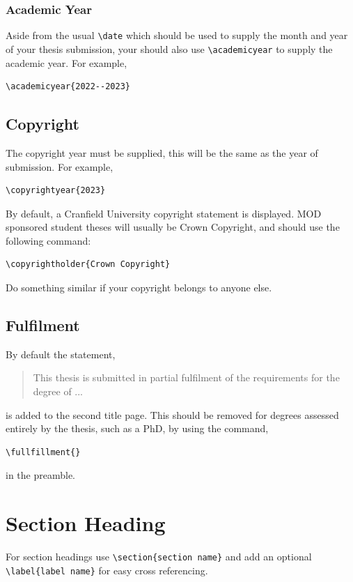 \documentclass[12pt,oneside]{book} %
\begin{document}
\subsubsection{Academic Year}
\label{sec:AcademicYear}
Aside from the usual \verb#\date# which should be used to supply the month and year of your thesis submission, your should also use \verb#\academicyear# to supply the academic year. For example,
\begin{verbatim} 
\academicyear{2022--2023}
\end{verbatim}

\subsection{Copyright}
\label{sec:copyright}
The copyright year must be supplied, this will be the same as the year of submission. For example,
\begin{verbatim} 
\copyrightyear{2023}
\end{verbatim}
By default, a Cranfield University copyright statement is displayed. MOD sponsored student theses will usually be Crown Copyright, and should use the following command:
\begin{verbatim}
\copyrightholder{Crown Copyright}
\end{verbatim}
Do something similar if your copyright belongs to anyone else.

\subsection{Fulfilment}
\label{sec:Fulfilment}
By default the statement,
\begin{quote} 
This thesis is submitted in partial fulfilment of the requirements for the degree of ...
\end{quote}
is added to the second title page. This should be removed for degrees assessed entirely by the thesis, such as a PhD, by using the command,
\begin{verbatim}
\fullfillment{}
\end{verbatim}
in the preamble. 

\section{Section Heading}
\label{sec:SectionHeading}
For section headings use \verb#\section{section name}# and add an optional \linebreak\verb#\label{label name}# for easy cross referencing. 
\end{document}
